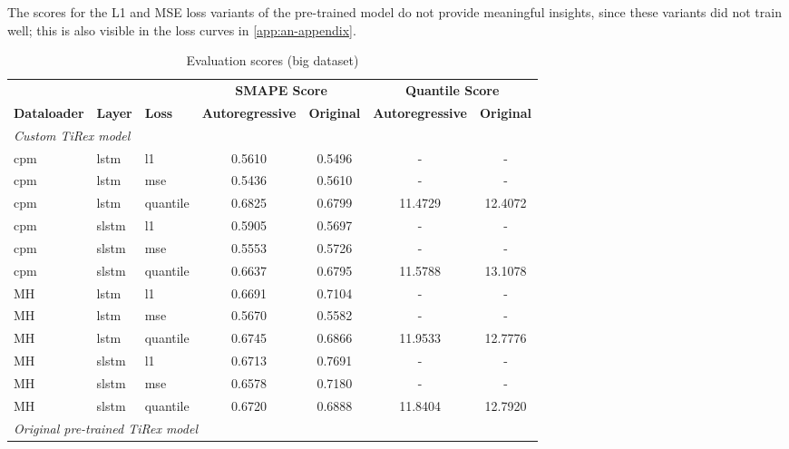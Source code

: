 \documentclass[a4paper,oneside,10pt,ngerman,english]{scrartcl}
\begin{document}
The scores for the L1 and MSE loss variants of the pre-trained model do not provide meaningful insights, since these variants did not train well; this is also visible in the loss curves in \autoref{app:an-appendix}.

\begin{table}[htbp]
	\centering
	\begin{threeparttable}
		\caption{Evaluation scores (big dataset)}
		\label{tab:scores_custom_tirex_full}
		\begin{tabular}{lllcccc}
			\toprule
			& & & \multicolumn{2}{c}{\textbf{SMAPE Score}} & \multicolumn{2}{c}{\textbf{Quantile Score}} \\
			\cmidrule(lr){4-5} \cmidrule(lr){6-7}
			\textbf{Dataloader} & \textbf{Layer} & \textbf{Loss} & \textbf{Autoregressive} & \textbf{Original} & \textbf{Autoregressive} & \textbf{Original} \\
			\midrule
			\multicolumn{7}{l}{{\small \emph{Custom TiRex model}}}\\
			cpm & lstm & l1         & 0.5610 & \cellcolor[HTML]{fdfebc}0.5496 & -  & -  \\
			cpm & lstm & mse        & \cellcolor[HTML]{fdfebc}0.5436 & 0.5610 & -  & -  \\
			cpm & lstm & quantile   & 0.6825 & \cellcolor[HTML]{fdfebc}0.6799 & 11.4729 & 12.4072 \\
			\addlinespace
			cpm & slstm & l1        & 0.5905 & \cellcolor[HTML]{fdfebc}0.5697 & -  & -  \\
			cpm & slstm & mse       & \cellcolor[HTML]{fdfebc}0.5553 & 0.5726 & -  & -  \\
			cpm & slstm & quantile  & \cellcolor[HTML]{fdfebc}0.6637 & 0.6795 & 11.5788 & 13.1078 \\
			\addlinespace
			MH & lstm & l1       & \cellcolor[HTML]{fdfebc}0.6691 & 0.7104 & - & - \\
			MH & lstm & mse      & 0.5670 & \cellcolor[HTML]{fdfebc}0.5582 & -  & -  \\
			MH & lstm & quantile & \cellcolor[HTML]{fdfebc}0.6745 & 0.6866 & 11.9533 & 12.7776 \\
			\addlinespace
			MH & slstm & l1      & \cellcolor[HTML]{fdfebc}0.6713 & 0.7691 & - & - \\
			MH & slstm & mse     & \cellcolor[HTML]{fdfebc}0.6578 & 0.7180 & - & - \\
			MH & slstm & quantile & \cellcolor[HTML]{fdfebc}0.6720 & 0.6888 & 11.8404 & 12.7920 \\
			\midrule
			\multicolumn{7}{l}{{\small \emph{Original pre-trained TiRex model}}}\\

\end{tabular}
\end{threeparttable}
\end{table}
\end{document}
